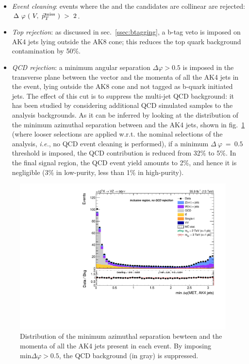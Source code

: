 \begin{itemize}
     \item \textit{Event cleaning}: events where the \V and the \Z candidates are collinear are rejected:\\$\Delta~\varphi~(~V,~\vec{p}_T^{\text{miss}}~)~>~2$.
     \item \textit{Top rejection}: as discussed in sec.~\ref{ssec:btagging}, a b-tag veto is imposed on AK4 jets lying outside the AK8 cone; this reduces the top quark background contamination by 50\%.
     \item \textit{QCD rejection}: a minimum angular separation $\Delta \varphi>0.5$ is imposed in the transverse plane between the \met vector and the momenta of all the AK4 jets in the event, lying outside the AK8 cone and not tagged as b-quark initiated jets. The effect of this cut is to suppress the multi-jet QCD background: it has been studied by considering additional QCD simulated samples to the analysis backgrounds. As it can be inferred by looking at the distribution of the minimum azimuthal separation between \met and the AK4 jets, shown in fig.~\ref{fig:QCD_cleaning} (where looser selections are applied w.r.t. the nominal selections of the analysis, \textit{i.e.}, no QCD event cleaning is performed), if a minimum $\Delta~\varphi~=~0.5$ threshold is imposed, the QCD contribution is reduced from 32\% to 5\%. In the final signal region, the QCD event yield amounts to 2\%, and hence it is negligible (3\% in low-purity, less than 1\% in high-purity).
\end{itemize}

\begin{figure}[!htb]
  \centering
    \includegraphics[width=.495\textwidth]{plots/v9_thesis/XVZnnNoQCDButPrunedMass/MinJetMetDPhi.pdf}
  \caption{Distribution of the minimum azimuthal separation bewteen \met and the momenta of all the AK4 jets present in each event. By imposing $\text{min} \Delta \varphi > 0.5$, the QCD background (in gray) is suppressed.}
  \label{fig:QCD_cleaning}
\end{figure}

